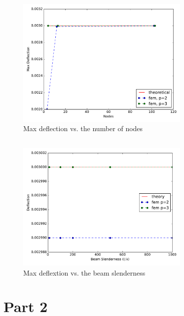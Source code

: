 \documentclass{article}
\begin{document}
\subsection{}
\begin{figure}[h!]
	\centering
	\includegraphics[width=0.75\textwidth]{max_deflection_vs_n}
	\caption{Max deflection vs. the number of nodes}
	\label{fig:12}
\end{figure}
\subsection{}
\begin{figure}[h!]
	\centering
	\includegraphics[width=0.75\textwidth, trim={-5cm, 0cm, 0cm, 0cm}]{max_deflection_vs_h}
	\caption{Max deflextion vs. the beam slenderness}
	\label{fig:12}
\end{figure}
\section{Part 2}

\subsection{}

\subsection{}
\end{document}
